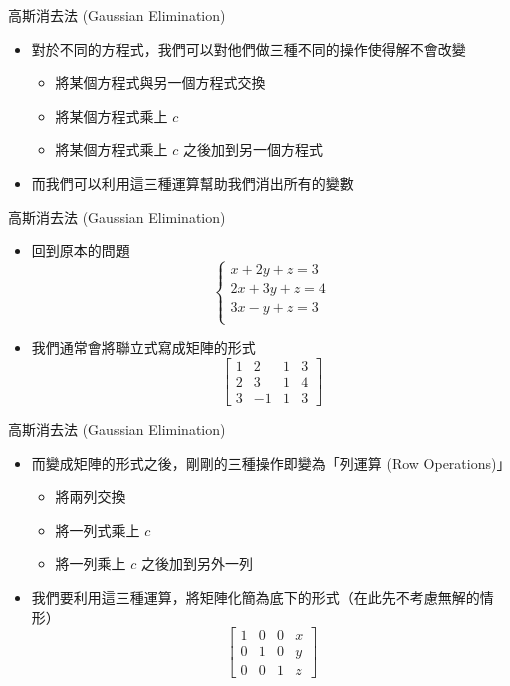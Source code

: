 \documentclass[aspectratio=169]{beamer}
\begin{document}
    \begin{frame}{高斯消去法 (Gaussian Elimination)}
        \begin{itemize}
            \item 對於不同的方程式，我們可以對他們做三種不同的操作使得解不會改變
            \begin{itemize}
                \item 將某個方程式與另一個方程式交換
                \item 將某個方程式乘上 $c$
                \item 將某個方程式乘上 $c$ 之後加到另一個方程式
            \end{itemize}
            \item 而我們可以利用這三種運算幫助我們消出所有的變數
        \end{itemize} 
    \end{frame}
    
    \begin{frame}{高斯消去法 (Gaussian Elimination)}
        \begin{itemize}
            \item 回到原本的問題
            $$\begin{cases}
                x + 2y + z = 3 \\
                2x + 3y + z = 4 \\
                3x - y + z = 3 \\
            \end{cases}$$
            \item 我們通常會將聯立式寫成矩陣的形式
            $$\begin{bmatrix}1 & 2 & 1 & 3 \\ 2 & 3 & 1 & 4 \\ 3 & -1 & 1 & 3\end{bmatrix}$$
        \end{itemize} 
    \end{frame}
    
    \begin{frame}{高斯消去法 (Gaussian Elimination)}
        \begin{itemize}
            \item 而變成矩陣的形式之後，剛剛的三種操作即變為「列運算 (Row Operations)」
            \begin{itemize}
                \item 將兩列交換
                \item 將一列式乘上 $c$
                \item 將一列乘上 $c$ 之後加到另外一列
            \end{itemize}
            \item 我們要利用這三種運算，將矩陣化簡為底下的形式（在此先不考慮無解的情形）
            $$\begin{bmatrix}1 & 0 & 0 & x \\ 0 & 1 & 0 & y \\ 0 & 0 & 1 & z\end{bmatrix}$$
        \end{itemize} 
    \end{frame}
    
\end{document}

